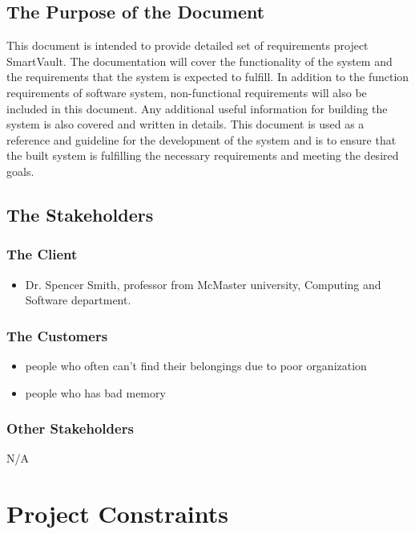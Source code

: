 \documentclass[12pt]{article}
\begin{document}
\subsection{The Purpose of the Document}
This document is intended to provide detailed set of requirements project SmartVault. The documentation will cover the functionality of the system and the requirements that the system is expected to fulfill. In addition to the function requirements of software system, non-functional requirements will also be included in this document. Any additional useful information for building the system is also covered and written in details. This document is used as a reference and guideline for the development of the system and is to ensure that the built system is fulfilling the necessary requirements and meeting the desired goals.
\subsection{The Stakeholders}

\subsubsection{The Client}
\begin{itemize}
    \item Dr. Spencer Smith, professor from McMaster university, Computing and Software department. 
\end{itemize}

\subsubsection{The Customers}
\begin{itemize}
    \item people who often can't find their belongings due to poor organization
   	\item people who has bad memory  
\end{itemize}
\subsubsection{Other Stakeholders}
N/A
\section{Project Constraints}
\end{document}
